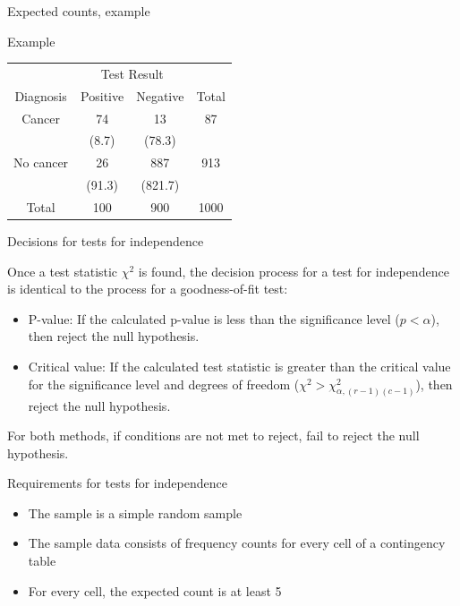 \documentclass[xcolor=table, aspectratio=169, bigger]{beamer}
\begin{document}
\begin{frame}{Expected counts, example}
\begin{exampleblock}{Example}
\smallskip
{\centering
\begin{tabular}{c | c  c | c}
\multicolumn{1}{c}{} & \multicolumn{2}{c}{Test Result}\\
Diagnosis & Positive & Negative & Total\\
\hline
Cancer & 74 & 13 & 87\\
& (8.7) & (78.3)\\
No cancer & 26 & 887 & 913 \\
& (91.3) & (821.7)\\
\hline
Total & 100 & 900 & 1000
\end{tabular}
\par}
\smallskip
\end{exampleblock}
\end{frame}

\begin{frame}{Decisions for tests for independence}
\begin{block}{}
Once a test statistic $\chi^2$ is found, the decision process for a test for independence is identical to the process for a goodness-of-fit test:
\begin{itemize}
\pause\item P-value: If the calculated p-value is less than the significance level ($p < \alpha$), then reject the null hypothesis.
\pause\item Critical value: If the calculated test statistic is greater than the critical value for the significance level and degrees of freedom ($\chi^2 > \chi^2_{\alpha, (r-1)(c-1)}$), then reject the null hypothesis.
\end{itemize}
\pause\medskip
For both methods, if conditions are not met to reject, fail to reject the null hypothesis.\\
\end{block}
\end{frame}


\begin{frame}{Requirements for tests for independence}
\begin{block}{}
\begin{itemize}
\item The sample is a simple random sample
\pause\item The sample data consists of frequency counts for every cell of a contingency table
\pause\item For every cell, the expected count is at least 5 
\end{itemize}
\end{block}
\end{frame}
\end{document}
